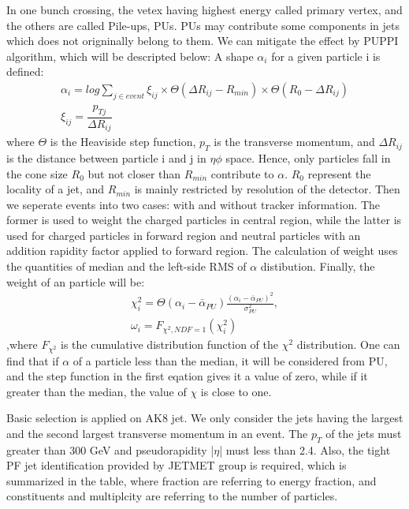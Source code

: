 In one bunch crossing, the vetex having highest energy called primary vertex, and the others are called Pile-ups, PUs. PUs may contribute some components in jets which does not origninally belong to them. We can mitigate the effect by PUPPI algorithm, which will be descripted below:
 A shape $\alpha _{i}$ for a given particle i is defined: 
\begin{equation} \label{eq2}
\begin{split}
\alpha_i = log \sum\limits_{j\in event} \xi _{ij} \times \Theta(\Delta R_{ij} - R_{min}) \times \Theta(R_0 - \Delta R_{ij}) \\
\xi _{ij} = \dfrac{p_{Tj}}{\Delta R_{ij}}
\end{split}
\end{equation}
where $\Theta$ is the Heaviside step function, $p_{T}$ is the transverse momentum, and $\Delta R_{ij}$ is the distance between particle i and j in $\eta \phi$ space. Hence, only particles fall in the cone size $R_0$ but not closer than $R_{min}$ contribute to $\alpha $. $R_0$ represent the locality of a jet, and $R_{min}$ is mainly restricted by resolution of the detector. Then we seperate events into two cases: with and without tracker information. The former is used to weight the charged particles in central region, while the latter is used for charged particles in forward region and neutral particles with an addition rapidity factor applied to forward region. The calculation of weight uses the quantities of median and the left-side RMS of $\alpha $ distibution. Finally, the weight of an particle will be: 
\begin{equation} \label{eq3}
\begin{split}
\chi ^2_{i} = \Theta(\alpha _i - \bar{\alpha } _{PU}) \frac{ ( \alpha _i - \bar{\alpha } _{PU})^2 }{\sigma ^2 _{PU}} , \\
\omega _i = F_{\chi ^2,NDF=1}(\chi ^2_i) 
\end{split}
\end{equation}
,where $F_{\chi ^2}$ is the cumulative distribution function of the $\chi ^2$ distribution. One can find that if $\alpha $ of a particle less than the median, it will be considered from PU, and the step function in the first eqation gives it a value of zero, while if it greater than the median, the value of $\chi $ is close to one. 

Basic selection is applied on AK8 jet. We only consider the jets having the largest and the second largest transverse momentum in an event. The $p_{T}$ of the jets must greater than 300 GeV and pseudorapidity |$\eta$| must less than 2.4. Also, the tight PF jet identification provided by JETMET group is required, which is summarized in the table, where fraction are referring to energy fraction, and constituents and multiplcity are referring to the number of particles.

